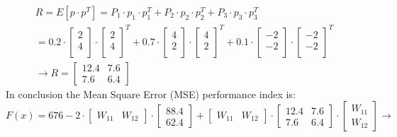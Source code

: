 \[
\begin{gathered}
	R = E[p \cdot p^T] = P_1 \cdot p_1 \cdot p_1^T + P_2 \cdot p_2 \cdot p_2^T + P_3 \cdot p_3 \cdot p_3^T \\ = 0.2 \cdot \left[
	\begin{array}{c}  
		2 \\  
		4 \\
	\end{array}
	\right] \cdot \left[
	\begin{array}{c}  
		2 \\  
		4 \\
	\end{array}
	\right]^T +  0.7 \cdot \left[
	\begin{array}{c}  
		4 \\  
		2 \\
	\end{array}
	\right] \cdot \left[
	\begin{array}{c}  
		4 \\  
		2 \\
	\end{array}
	\right]^T +  0.1 \cdot \left[
	\begin{array}{c}  
		-2 \\  
		-2 \\
	\end{array}
	\right] \cdot \left[
	\begin{array}{c}  
		-2 \\  
		-2 \\
	\end{array}
	\right]^T \\
	\rightarrow R = \left[
	\begin{array}{cc}
		12.4 & 7.6 \\
		7.6 & 6.4
	\end{array}
	\right]	
\end{gathered}
\]
\vspace{2mm}
In conclusion the Mean Square Error (MSE) performance index is:
\[
F(x) = 676 - 2 \cdot \left[\begin{array}{cc}
	W_{11} & W_{12}
\end{array}
\right] \cdot \left[\begin{array}{c}
	88.4 \\
	62.4
\end{array}
\right] + \left[\begin{array}{cc}
	W_{11} & W_{12}
\end{array}
\right] \cdot \left[
\begin{array}{cc}
	12.4 & 7.6 \\
	7.6 & 6.4
\end{array}
\right]	\cdot \left[\begin{array}{c}
	W_{11} \\
	W_{12}
\end{array}
\right] \rightarrow
\]

